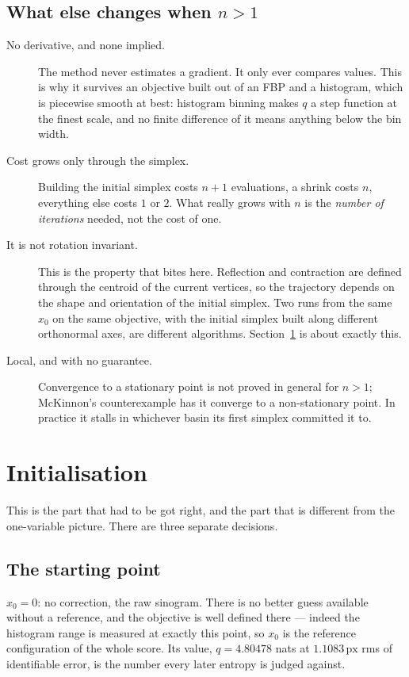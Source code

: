 \documentclass[11pt,a4paper]{article}
\newcommand{\px}{\,\text{px}}
\begin{document}
\subsection{What else changes when $n>1$}

\begin{description}
\item[No derivative, and none implied.] The method never estimates a gradient.
  It only ever compares values.  This is why it survives an objective built
  out of an FBP and a histogram, which is piecewise smooth at best: histogram
  binning makes $q$ a step function at the finest scale, and no finite
  difference of it means anything below the bin width.
\item[Cost grows only through the simplex.] Building the initial simplex costs
  $n+1$ evaluations, a shrink costs $n$, everything else costs $1$ or $2$.
  What really grows with $n$ is the \emph{number of iterations} needed, not
  the cost of one.
\item[It is not rotation invariant.] This is the property that bites here.
  Reflection and contraction are defined through the centroid of the current
  vertices, so the trajectory depends on the shape and orientation of the
  initial simplex.  Two runs from the same $x_0$ on the same objective, with
  the initial simplex built along different orthonormal axes, are different
  algorithms.  Section~\ref{sec:init} is about exactly this.
\item[Local, and with no guarantee.] Convergence to a stationary point is not
  proved in general for $n>1$; McKinnon's counterexample has it converge to a
  non-stationary point.  In practice it stalls in whichever basin its first
  simplex committed it to.
\end{description}

\section{Initialisation}
\label{sec:init}

This is the part that had to be got right, and the part that is different from
the one-variable picture.  There are three separate decisions.

\subsection{The starting point}

$x_0=0$: no correction, the raw sinogram.  There is no better guess available
without a reference, and the objective is well defined there --- indeed the
histogram range is measured at exactly this point, so $x_0$ is the reference
configuration of the whole score.  Its value, $q=4.80478$ nats at
$1.1083\px$ rms of identifiable error, is the number every later entropy is
judged against.
\end{document}
